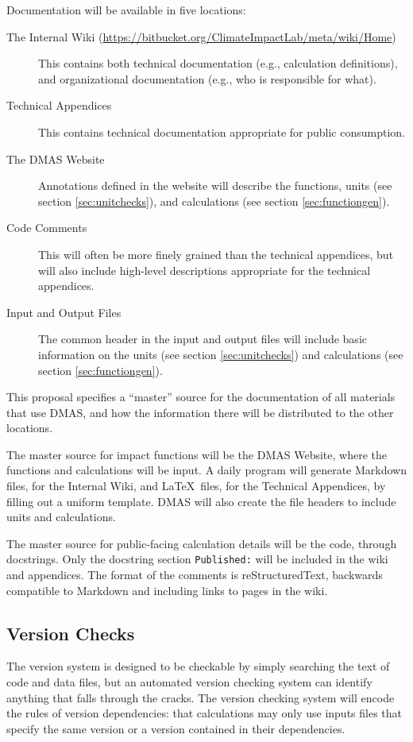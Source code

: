 \documentclass[12pt, oneside]{amsart}
\begin{document}
Documentation will be available in five locations:
\begin{description}
\item[The Internal Wiki (\url{https://bitbucket.org/ClimateImpactLab/meta/wiki/Home})] This contains both technical documentation (e.g., calculation definitions), and organizational documentation (e.g., who is responsible for what).
\item[Technical Appendices] This contains technical documentation appropriate for public consumption.
\item[The DMAS Website] Annotations defined in the website will describe the functions, units (see section \ref{sec:unitchecks}), and calculations (see section \ref{sec:functiongen}).
\item[Code Comments] This will often be more finely grained than the technical appendices, but will also include high-level descriptions appropriate for the technical appendices.
\item[Input and Output Files] The common header in the input and output files will include basic information on the units (see section \ref{sec:unitchecks}) and calculations (see section \ref{sec:functiongen}).
\end{description}

This proposal specifies a ``master'' source for the documentation of all materials that use DMAS, and how the information there will be distributed to the other locations.

The master source for impact functions will be the DMAS Website, where the functions and calculations will be input.  A daily program will generate Markdown files, for the Internal Wiki, and \LaTeX\ files, for the Technical Appendices, by filling out a uniform template.  DMAS will also create the file headers to include units and calculations.

The master source for public-facing calculation details will be the code, through docstrings.  Only the docstring section {\tt Published:} will be included in the wiki and appendices.  The format of the comments is reStructuredText, backwards compatible to Markdown and including links to pages in the wiki.

\subsection{Version Checks}
\label{sec:versioncheck}

The version system is designed to be checkable by simply searching the
text of code and data files, but an automated version checking system
can identify anything that falls through the cracks.  The version
checking system will encode the rules of version dependencies: that
calculations may only use inputs files that specify the same version
or a version contained in their dependencies.
\end{document}
